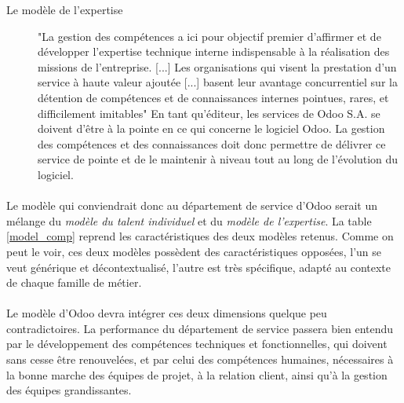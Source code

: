 \begin{description}
  \item[Le modèle de l'expertise]
  "La gestion des compétences a ici pour objectif premier d'affirmer et de développer l'expertise technique interne indispensable à la réalisation des missions de l'entreprise. [...] Les organisations qui visent la prestation d'un service à haute valeur ajoutée [...] basent leur avantage concurrentiel sur la détention de compétences et de connaissances internes pointues, rares, et difficilement imitables"\citep[pp.45]{delobbe} En tant qu'éditeur, les services de Odoo S.A. se doivent d'être à la pointe en ce qui concerne le logiciel Odoo. La gestion des compétences et des connaissances doit donc permettre de délivrer ce service de pointe et de le maintenir à niveau tout au long de l'évolution du logiciel. 
\end{description}


\paragraph{}Le modèle qui conviendrait donc au département de service d'Odoo serait un mélange du \textit{modèle du talent individuel} et du \textit{modèle de l'expertise}. La table \ref{model_comp} reprend les caractéristiques des deux modèles retenus. Comme on peut le voir, ces deux modèles possèdent des caractéristiques opposées, l'un se veut générique et décontextualisé, l'autre est très spécifique, adapté au contexte de chaque famille de métier. 

\paragraph{}Le modèle d'Odoo devra intégrer ces deux dimensions quelque peu contradictoires.
La performance du département de service passera bien entendu par le développement des compétences techniques et fonctionnelles, qui doivent sans cesse être renouvelées, et par celui des compétences humaines, nécessaires à la bonne marche des équipes de projet, à la relation client, ainsi qu'à la gestion des équipes grandissantes.



